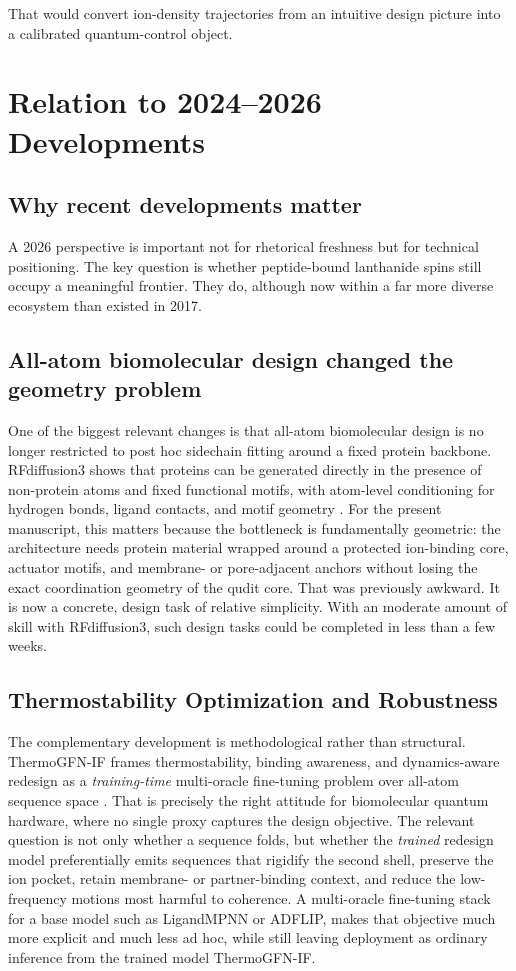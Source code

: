 \documentclass[11pt]{report}
\theoremstyle{definition}
\begin{document}
That would convert ion-density trajectories from an intuitive design picture into a calibrated quantum-control object.

\chapter{Relation to 2024--2026 Developments}

\section{Why recent developments matter}
A 2026 perspective is important not for rhetorical freshness but for technical positioning. The key question is whether peptide-bound lanthanide spins still occupy a meaningful frontier. They do, although now within a far more diverse ecosystem than existed in 2017.

\section{All-atom biomolecular design changed the geometry problem}
One of the biggest relevant changes is that all-atom biomolecular design is no longer restricted to post hoc sidechain fitting around a fixed protein backbone. RFdiffusion3 shows that proteins can be generated directly in the presence of non-protein atoms and fixed functional motifs, with atom-level conditioning for hydrogen bonds, ligand contacts, and motif geometry \cite{rfdiffusion32025}. For the present manuscript, this matters because the bottleneck is fundamentally geometric: the architecture needs protein material wrapped around a protected ion-binding core, actuator motifs, and membrane- or pore-adjacent anchors without losing the exact coordination geometry of the qudit core. That was previously awkward. It is now a concrete, design task of relative simplicity. With an moderate amount of skill with RFdiffusion3, such design tasks could be completed in less than a few weeks. 

\section{Thermostability Optimization and Robustness}
The complementary development is methodological rather than structural. ThermoGFN-IF frames thermostability, binding awareness, and dynamics-aware redesign as a \emph{training-time} multi-oracle fine-tuning problem over all-atom sequence space \cite{thermogfnif2026}. That is precisely the right attitude for biomolecular quantum hardware, where no single proxy captures the design objective. The relevant question is not only whether a sequence folds, but whether the \emph{trained} redesign model preferentially emits sequences that rigidify the second shell, preserve the ion pocket, retain membrane- or partner-binding context, and reduce the low-frequency motions most harmful to coherence. A multi-oracle fine-tuning stack for a base model such as LigandMPNN or ADFLIP, makes that objective much more explicit and much less ad hoc, while still leaving deployment as ordinary inference from the trained model ThermoGFN-IF. 
\end{document}

